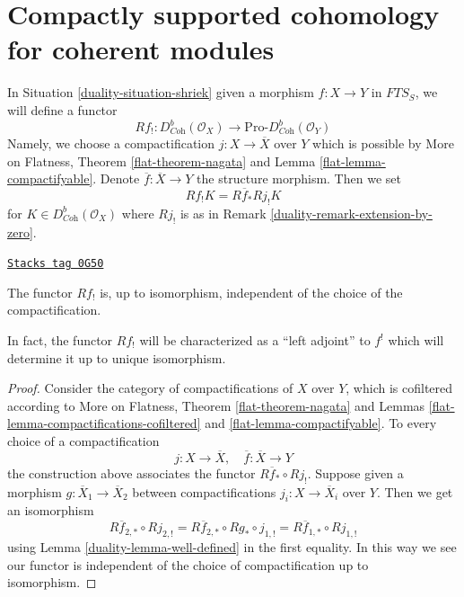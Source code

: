 \section{Compactly supported cohomology for coherent modules}
\label{duality-section-compactly-supported}
In Situation \ref{duality-situation-shriek} given a morphism $f : X \to Y$
in $\textit{FTS}_S$, we will define a functor
$$
Rf_! : D^b_{\textit{Coh}}(\mathcal{O}_X)
\longrightarrow
\text{Pro-}D^b_{\textit{Coh}}(\mathcal{O}_Y)
$$
Namely, we choose a compactification $j : X \to \overline{X}$ over $Y$
which is possible by More on Flatness, Theorem \ref{flat-theorem-nagata} and
Lemma \ref{flat-lemma-compactifyable}. Denote
$\overline{f} : \overline{X} \to Y$ the structure morphism. Then we set
$$
Rf_!K  = R\overline{f}_* Rj_! K
$$
for $K \in D^b_{\textit{Coh}}(\mathcal{O}_X)$ where $Rj_!$ is
as in Remark \ref{duality-remark-extension-by-zero}.

\begin{lemma}
\label{duality-lemma-lower-shriek-well-defined}
\href{https://stacks.math.columbia.edu/tag/0G50}{\texttt{Stacks tag 0G50}}

The functor $Rf_!$ is, up to isomorphism, independent
of the choice of the compactification.
\end{lemma}

In fact, the functor $Rf_!$ will be characterized as a ``left adjoint''
to $f^!$ which will determine it up to unique isomorphism.

\begin{proof}

Consider the category of compactifications of $X$ over $Y$, which is
cofiltered according to More on Flatness, Theorem \ref{flat-theorem-nagata} and
Lemmas \ref{flat-lemma-compactifications-cofiltered} and
\ref{flat-lemma-compactifyable}.
To every choice of a compactification
$$
j : X \to \overline{X},\quad \overline{f} : \overline{X} \to Y
$$
the construction above associates the functor $R\overline{f}_* \circ Rj_!$.
Suppose given a morphism $g : \overline{X}_1 \to \overline{X}_2$
between compactifications $j_i : X \to \overline{X}_i$ over $Y$.
Then we get an isomorphism
$$
R\overline{f}_{2, *} \circ Rj_{2, !} =
R\overline{f}_{2, *} \circ Rg_* \circ j_{1, !} =
R\overline{f}_{1, *} \circ Rj_{1, !}
$$
using Lemma \ref{duality-lemma-well-defined} in the first equality. In this way
we see our functor is independent of the choice of compactification
up to isomorphism.
\end{proof}

